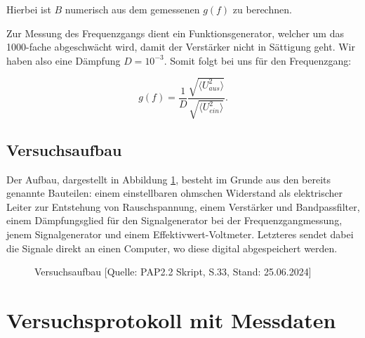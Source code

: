 \documentclass{article}
\begin{document}
Hierbei ist $B$ numerisch aus dem gemessenen $g(f)$ zu berechnen.

Zur Messung des Frequenzgangs dient ein Funktionsgenerator, welcher um das 1000-fache abgeschwächt wird, damit der Verstärker nicht in Sättigung geht. Wir haben also eine Dämpfung $D=10^{-3}$. Somit folgt bei uns für den Frequenzgang:

\begin{equation}
    g(f)= \frac{1}{D} \frac{\sqrt{\langle U_{aus}^2 \rangle}}{\sqrt{\langle U_{ein}^2 \rangle}}.
    \label{eq:Frequenzgang}
\end{equation}

\newpage
\subsection{Versuchsaufbau}

Der Aufbau, dargestellt in Abbildung \ref{fig:Aufbau}, besteht im Grunde aus den bereits genannte Bauteilen: einem einstellbaren ohmschen Widerstand als elektrischer Leiter zur Entstehung von Rauschspannung, einem Verstärker und Bandpassfilter, einem Dämpfungsglied für den Signalgenerator bei der Frequenzgangmessung, jenem Signalgenerator und einem Effektivwert-Voltmeter. Letzteres sendet dabei die Signale direkt an einen Computer, wo diese digital abgespeichert werden. 

\phantom{.}

\begin{figure}[!h]
    \centering
    \caption{Versuchsaufbau [Quelle: PAP2.2 Skript, S.33, Stand: 25.06.2024]}
    \label{fig:Aufbau}
\end{figure}





\newpage

\section{Versuchsprotokoll mit Messdaten}
\end{document}
